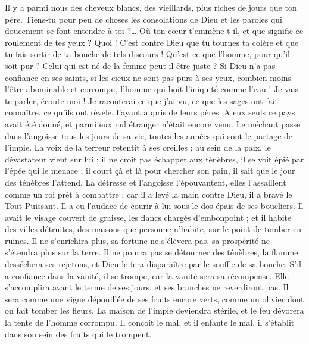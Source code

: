 \begin{multicols}{2}
Il y a parmi nous des cheveux blancs, des vieillards, plus riches de jours que ton père.
Tiens-tu pour peu de choses les consolations de Dieu et les paroles qui doucement se font entendre à toi ?…
Où ton cœur t'emmène-t-il, et que signifie ce roulement de tes yeux ?
Quoi ! C'est contre Dieu que tu tournes ta colère et que tu fais sortir de ta bouche de tels discours !
Qu'est-ce que l'homme, pour qu'il soit pur ? Celui qui est né de la femme peut-il être juste ?
Si Dieu n'a pas confiance en ses saints, si les cieux ne sont pas purs à ses yeux,
combien moins l'être abominable et corrompu, l'homme qui boit l'iniquité comme l'eau !
Je vais te parler, écoute-moi ! Je raconterai ce que j'ai vu,
ce que les sages ont fait connaître, ce qu'ils ont révélé, l'ayant appris de leurs pères.
A eux seuls ce pays avait été donné, et parmi eux nul étranger n'était encore venu.
Le méchant passe dans l'angoisse tous les jours de sa vie, toutes les années qui sont le partage de l'impie.
La voix de la terreur retentit à ses oreilles ; au sein de la paix, le dévastateur vient sur lui ;
il ne croit pas échapper aux ténèbres, il se voit épié par l'épée qui le menace ;
il court çà et là pour chercher son pain, il sait que le jour des ténèbres l'attend.
La détresse et l'angoisse l'épouvantent, elles l'assaillent comme un roi prêt à combattre ;
car il a levé la main contre Dieu, il a bravé le Tout-Puissant.
Il a eu l'audace de courir à lui sous le dos épais de ses boucliers.
Il avait le visage couvert de graisse, les flancs chargés d'embonpoint ;
et il habite des villes détruites, des maisons que personne n'habite, sur le point de tomber en ruines.
Il ne s'enrichira plus, sa fortune ne s'élèvera pas, sa prospérité ne s'étendra plus sur la terre.
Il ne pourra pas se détourner des ténèbres, la flamme desséchera ses rejetons, et Dieu le fera disparaître par le souffle de sa bouche.
S'il a confiance dans la vanité, il se trompe, car la vanité sera sa récompense.
Elle s'accomplira avant le terme de ses jours, et ses branches ne reverdiront pas.
Il sera comme une vigne dépouillée de ses fruits encore verts, comme un olivier dont on fait tomber les fleurs.
La maison de l'impie deviendra stérile, et le feu dévorera la tente de l'homme corrompu.
Il conçoit le mal, et il enfante le mal, il s'établit dans son sein des fruits qui le trompent.

\end{multicols}

